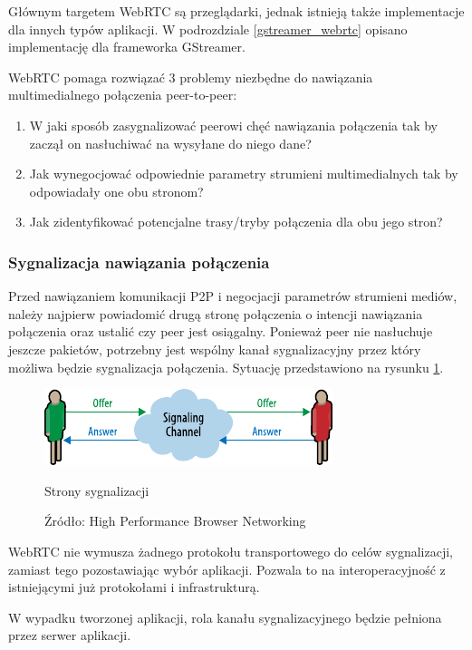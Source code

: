 Głównym targetem WebRTC są przeglądarki, jednak istnieją także implementacje dla innych typów
aplikacji. W podrozdziale \ref{gstreamer_webrtc} opisano implementację dla frameworka GStreamer.

WebRTC pomaga rozwiązać 3 problemy niezbędne do nawiązania multimedialnego połączenia peer-to-peer:

\begin{enumerate}
    \item W jaki sposób zasygnalizować peerowi chęć nawiązania połączenia tak by zaczął on
          nasłuchiwać na wysyłane do niego dane?
    \item Jak wynegocjować odpowiednie parametry strumieni multimedialnych tak by odpowiadały one
          obu stronom?
    \item Jak zidentyfikować potencjalne trasy/tryby połączenia dla obu jego stron?
\end{enumerate}

\subsubsection{Sygnalizacja nawiązania połączenia}

Przed nawiązaniem komunikacji P2P i negocjacji parametrów strumieni mediów, należy najpierw
powiadomić drugą stronę połączenia o intencji nawiązania połączenia oraz ustalić czy peer jest
osiągalny. Ponieważ peer nie nasłuchuje jeszcze pakietów, potrzebny jest wspólny kanał
sygnalizacyjny przez który możliwa będzie sygnalizacja połączenia. Sytuację przedstawiono na rysunku
\ref{fig:signaling}.

\begin{figure}[H]
    \centering
    \includegraphics{img/signaling-1}
    \caption{Strony sygnalizacji}
    \caption*{Źródło: High Performance Browser Networking\cite{hpbn}}
    \label{fig:signaling}
\end{figure}

WebRTC nie wymusza żadnego protokołu transportowego do celów sygnalizacji, zamiast tego
pozostawiając wybór aplikacji. Pozwala to na interoperacyjność z istniejącymi już protokołami i
infrastrukturą.

W wypadku tworzonej aplikacji, rola kanału sygnalizacyjnego będzie pełniona przez serwer aplikacji.

